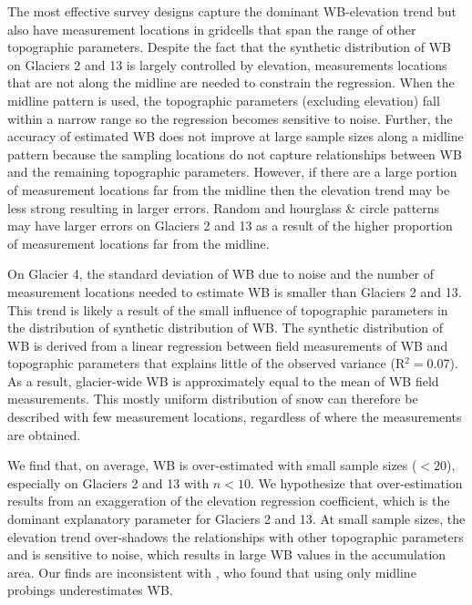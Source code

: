 \documentclass{article}
\begin{document}
The most effective survey designs capture the dominant WB-elevation trend but also have measurement locations in gridcells that span the range of other topographic parameters. Despite the fact that the synthetic distribution of WB on Glaciers 2 and 13 is largely controlled by elevation, measurements locations that are not along the midline are needed to constrain the regression. When the midline pattern is used, the topographic parameters (excluding elevation) fall within a narrow range so the regression becomes sensitive to noise. Further, the accuracy of estimated WB does not improve at large sample sizes along a midline pattern because the sampling locations do not capture relationships between WB and the remaining topographic parameters. However, if there are a large portion of measurement locations far from the midline then the elevation trend may be less strong resulting in larger errors. Random and hourglass \& circle patterns may have larger errors on Glaciers 2 and 13 as a result of the higher proportion of measurement locations far from the midline. 

On Glacier 4, the standard deviation of WB due to noise and the number of measurement locations needed to estimate WB is smaller than Glaciers 2 and 13. This trend is likely a result of the small influence of topographic parameters in the distribution of synthetic distribution of WB. The synthetic distribution of WB is derived from a linear regression between field measurements of WB and topographic parameters that explains little of the observed variance (R$^2=$0.07). As a result, glacier-wide WB is approximately equal to the mean of WB field measurements. This mostly uniform distribution of snow can therefore be described with few measurement locations, regardless of where the measurements are obtained. 

We find that, on average, WB is over-estimated with small sample sizes ($<20$), especially on Glaciers 2 and 13 with $n<10$. We hypothesize that over-estimation results from an exaggeration of the elevation regression coefficient, which is the dominant explanatory parameter for Glaciers 2 and 13. At small sample sizes, the elevation trend over-shadows the relationships with other topographic parameters and is sensitive to noise, which results in large WB values in the accumulation area. Our finds are inconsistent with \Textcite{Walmsley2015}, who found that using only midline probings underestimates WB.
\end{document}
